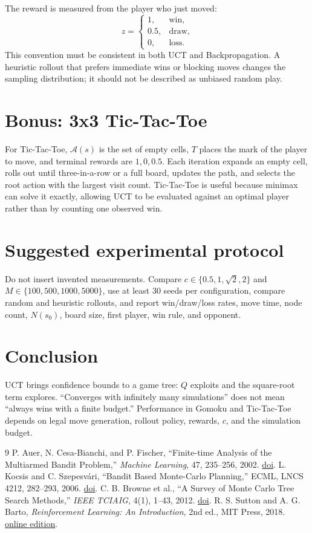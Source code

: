 \documentclass[conference]{IEEEtran}
\begin{document}
The reward is measured from the player who just moved:
\[
z=\begin{cases}1,&\text{win},\\0.5,&\text{draw},\\0,&\text{loss}.
\end{cases}
\]
This convention must be consistent in both UCT and Backpropagation. A heuristic
rollout that prefers immediate wins or blocking moves changes the sampling
distribution; it should not be described as unbiased random play.

\section{Bonus: 3x3 Tic-Tac-Toe}
For Tic-Tac-Toe, $\mathcal A(s)$ is the set of empty cells, $T$ places the mark of
the player to move, and terminal rewards are $1,0,0.5$. Each iteration expands an
empty cell, rolls out until three-in-a-row or a full board, updates the path, and
selects the root action with the largest visit count. Tic-Tac-Toe is useful because
minimax can solve it exactly, allowing UCT to be evaluated against an optimal player
rather than by counting one observed win.

\section{Suggested experimental protocol}
Do not insert invented measurements. Compare $c\in\{0.5,1,\sqrt2,2\}$ and
$M\in\{100,500,1000,5000\}$, use at least 30 seeds per configuration, compare
random and heuristic rollouts, and report win/draw/loss rates, move time, node
count, $N(s_0)$, board size, first player, win rule, and opponent.

\section{Conclusion}
UCT brings confidence bounds to a game tree: $Q$ exploits and the square-root term
explores. ``Converges with infinitely many simulations'' does not mean ``always
wins with a finite budget.'' Performance in Gomoku and Tic-Tac-Toe depends on
legal move generation, rollout policy, rewards, $c$, and the simulation budget.

\begin{thebibliography}{9}
 P. Auer, N. Cesa-Bianchi, and P. Fischer, ``Finite-time
Analysis of the Multiarmed Bandit Problem,'' \emph{Machine Learning}, 47,
235--256, 2002. \href{https://doi.org/10.1023/A:1013689704352}{doi}.
 L. Kocsis and C. Szepesvári, ``Bandit Based Monte-Carlo
Planning,'' ECML, LNCS 4212, 282--293, 2006.
\href{https://doi.org/10.1007/11871842_29}{doi}.
 C. B. Browne et al., ``A Survey of Monte Carlo Tree Search
Methods,'' \emph{IEEE TCIAIG}, 4(1), 1--43, 2012.
\href{https://doi.org/10.1109/TCIAIG.2012.2186810}{doi}.
 R. S. Sutton and A. G. Barto, \emph{Reinforcement Learning:
An Introduction}, 2nd ed., MIT Press, 2018.
\href{http://incompleteideas.net/book/the-book-2nd.html}{online edition}.
\end{thebibliography}
\end{document}
